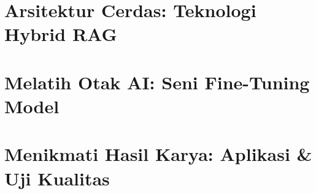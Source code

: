 \documentclass[11pt,twoside,openright]{book}
\begin{document}
\part{Arsitektur Cerdas: Teknologi Hybrid RAG}




\part{Melatih Otak AI: Seni Fine-Tuning Model}




\part{Menikmati Hasil Karya: Aplikasi \& Uji Kualitas}




\backmatter

\end{document}
